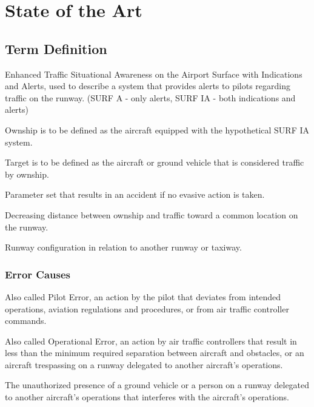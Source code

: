 \chapter{State of the Art}
\label{ch:grundlagen}


\section{Term Definition}

\begin{description}
    [font=\normalfont,leftmargin=1.9in,style=multiline]
    \item[SURF IA]
        Enhanced Traffic Situational Awareness on the Airport Surface with Indications and Alerts, used to describe a system that provides alerts to pilots regarding traffic on the runway. (SURF A - only alerts, SURF IA - both indications and alerts)
    \item[Ownship]
        Ownship is to be defined as the aircraft equipped with the hypothetical SURF IA system.
    \item[Target]
        Target is to be defined as the aircraft or ground vehicle that is considered traffic by ownship.
    \item[Conflict Geometry]
        Parameter set that results in an accident if no evasive action is taken.
    \item[Convergence]
        Decreasing distance between ownship and traffic toward a common location on the runway.
        
        
    \item[Runway Geometry]
        Runway configuration in relation to another runway or taxiway.
\end{description}


\subsection{Error Causes}

\begin{description}
    [font=\normalfont,leftmargin=1.9in,style=multiline]
        \item[Pilot Deviation]
        Also called Pilot Error, an action by the pilot that deviates from intended operations, aviation regulations and procedures, or from air traffic controller commands.
    \item[Operational Incident]
        Also called Operational Error, an action by air traffic controllers that result in less than the minimum required separation between aircraft and obstacles, or an aircraft trespassing on a runway delegated to another aircraft's operations.
    \item[Vehicle/Pedestrian Deviation]
        The unauthorized presence of a ground vehicle or a person on a runway delegated to another aircraft's operations that interferes with the aircraft's operations.
\end{description}

